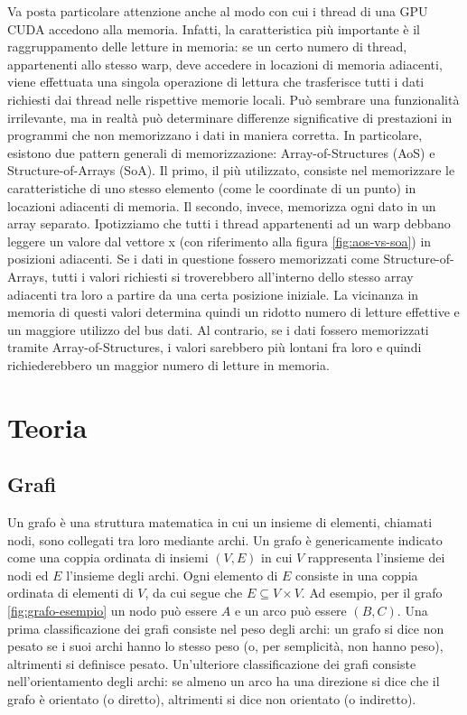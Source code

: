 \documentclass[12pt,a4paper,oneside]{book}
\begin{document}
	Va posta particolare attenzione anche al modo con cui i thread di una GPU CUDA accedono alla memoria. Infatti, la caratteristica più importante è il raggruppamento delle letture in memoria: se un certo numero di thread, appartenenti allo stesso warp, deve accedere in locazioni di memoria adiacenti, viene effettuata una singola operazione di lettura che trasferisce tutti i dati richiesti dai thread nelle rispettive memorie locali. Può sembrare una funzionalità irrilevante, ma in realtà può determinare differenze significative di prestazioni in programmi che non memorizzano i dati in maniera corretta. In particolare, esistono due pattern generali di memorizzazione: Array-of-Structures (AoS) e Structure-of-Arrays (SoA). Il primo, il più utilizzato, consiste nel memorizzare le caratteristiche di uno stesso elemento (come le coordinate di un punto) in locazioni adiacenti di memoria. Il secondo, invece, memorizza ogni dato in un array separato. Ipotizziamo che tutti i thread appartenenti ad un warp debbano leggere un valore dal vettore x (con riferimento alla figura \ref{fig:aos-vs-soa}) in posizioni adiacenti. Se i dati in questione fossero memorizzati come Structure-of-Arrays, tutti i valori richiesti si troverebbero all'interno dello stesso array adiacenti tra loro a partire da una certa posizione iniziale. La vicinanza in memoria di questi valori determina quindi un ridotto numero di letture effettive e un maggiore utilizzo del bus dati. Al contrario, se i dati fossero memorizzati tramite Array-of-Structures, i valori sarebbero più lontani fra loro e quindi richiederebbero un maggior numero di letture in memoria.
	
	\chapter{Teoria}
	\label{chap:teoria}
	\section{Grafi}
	Un grafo è una struttura matematica in cui un insieme di elementi, chiamati nodi, sono collegati tra loro mediante archi. Un grafo è genericamente indicato come una coppia ordinata di insiemi $(V,E)$ in cui $V$ rappresenta l'insieme dei nodi ed $E$ l'insieme degli archi. Ogni elemento di $E$ consiste in una coppia ordinata di elementi di $V$, da cui segue che $E \subseteq V \times V$. Ad esempio, per il grafo \ref{fig:grafo-esempio} un nodo può essere $A$ e un arco può essere $(B,C)$. Una prima classificazione dei grafi consiste nel peso degli archi: un grafo si dice non pesato se i suoi archi hanno lo stesso peso (o, per semplicità, non hanno peso), altrimenti si definisce pesato. Un'ulteriore classificazione dei grafi consiste nell'orientamento degli archi: se almeno un arco ha una direzione si dice che il grafo è orientato (o diretto), altrimenti si dice non orientato (o indiretto).
\end{document}
